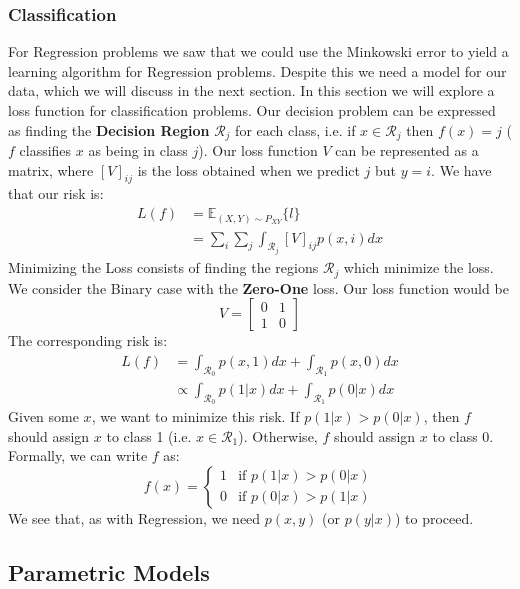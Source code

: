 \documentclass[]{article}
\theoremstyle{mattstyle}
\theoremstyle{definition}
\begin{document}
\newpage

\subsubsection{Classification}

For Regression problems we saw that we could use the Minkowski error to yield a learning algorithm for Regression problems. Despite this we need a model for our data, which we will discuss in the next section. In this section we will explore a loss function for classification problems. Our decision problem can be expressed as finding the \textbf{Decision Region} $\mathcal{R}_j$ for each class, i.e. if $x \in \mathcal{R}_j$ then $f(x)=j$ ($f$ classifies $x$ as being in class $j$).
Our loss function $V$ can be represented as a matrix, where $[V]_{ij}$ is the loss obtained when we predict $j$ but $y=i$. We have that our risk is:
\begin{align*}
L(f) &= \mathbb{E}_{(X,Y)\sim P_{XY}}\{l\}\\
&= \sum_i \sum_j \int_{\mathcal{R}_j} [V]_{ij} p(x, i) dx
\end{align*}
Minimizing the Loss consists of finding the regions $\mathcal{R}_j$ which minimize the loss.
We consider the Binary case with the \textbf{Zero-One} loss. Our loss function would be $$V = \begin{bmatrix}
0 & 1 \\
1 & 0
\end{bmatrix}$$
The corresponding risk is:
\begin{align*}
L(f)&=\int_{\mathcal{R}_0}p(x, 1) dx + \int_{\mathcal{R}_1}p(x, 0) dx\\
&\propto \int_{\mathcal{R}_0}p(1|x) dx + \int_{\mathcal{R}_1}p(0|x) dx
\end{align*}
Given some $x$, we want to minimize this risk. If $p(1|x) > p(0|x)$, then $f$ should assign $x$ to class 1 (i.e. $x \in \mathcal{R}_1$). Otherwise, $f$ should assign $x$ to class 0. Formally, we can write $f$ as:
$$f(x) = \begin{cases}
1 & \text{if } p(1|x) > p(0|x)\\
0 & \text{if } p(0|x) > p(1|x)
\end{cases}$$
We see that, as with Regression, we need $p(x,y)$ (or $p(y|x)$) to proceed.

\newpage

\subsection{Parametric Models}
\end{document}
